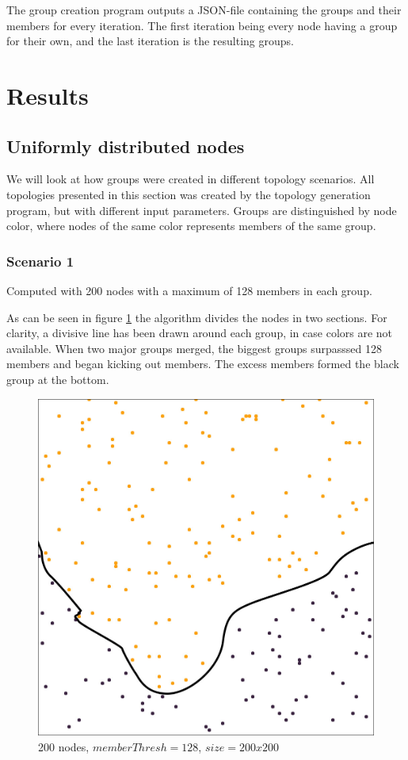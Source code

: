 \documentclass[a4paper,UKenglish]{report}
\begin{document}
The group creation program outputs a JSON-file containing the groups and their members for every iteration. The first iteration being every node having a group for their own,
and the last iteration is the resulting groups.
\section{Results}
\subsection{Uniformly distributed nodes}
We will look at how groups were created in different topology scenarios. 
All topologies presented in this section was created by the topology generation program,
but with different input parameters. Groups are distinguished by node color, where nodes
of the same color represents members of the same group. 
\subsubsection{Scenario 1}
Computed with 200 nodes with a maximum of 128 members in each group.

As can be seen in figure \ref{fig:200_128} the algorithm divides the nodes in two
sections. For clarity, a divisive line has been drawn around each group,
in case colors are not available.
When two major groups merged, the biggest groups surpasssed 128 members and began
kicking out members. The excess members formed the black group at the bottom. 

\begin{figure}
	\center
	\includegraphics[scale=0.45]{Images/grouptest_1.jpg}
	\caption{200 nodes, $memberThresh=128$, $size=200x200$}
	\label{fig:200_128}
\end{figure}
\end{document}
